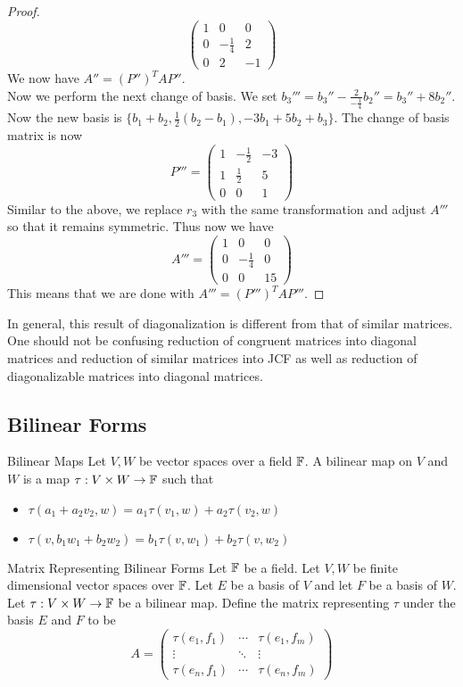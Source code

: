 \documentclass[a4paper]{article}
\begin{document}
\begin{eg}{}{}
\begin{proof}
$$\begin{pmatrix}
1 & 0 & 0\\
0 & -\frac{1}{4} & 2\\
0 & 2 & -1
\end{pmatrix}$$
We now have $A''=(P'')^TAP''$. \\
Now we perform the next change of basis. We set $b_3'''=b_3''-\frac{2}{-\frac{1}{4}}b_2''=b_3''+8b_2''$. Now the new basis is $\{b_1+b_2,\frac{1}{2}(b_2-b_1),-3b_1+5b_2+b_3\}$. The change of basis matrix is now $$P'''=\begin{pmatrix}
1 & -\frac{1}{2} & -3\\
1 & \frac{1}{2} & 5\\
0 & 0 & 1
\end{pmatrix}$$ Similar to the above, we replace $r_3$ with the same transformation and adjust $A'''$ so that it remains symmetric. Thus now we have $$A'''=\begin{pmatrix}
1 & 0 & 0\\
0 & -\frac{1}{4} & 0\\
0 & 0 & 15
\end{pmatrix}$$
This means that we are done with $A'''=(P''')^TAP'''$. 
\end{proof}
\end{eg}

In general, this result of diagonalization is different from that of similar matrices. One should not be confusing reduction of congruent matrices into diagonal matrices and reduction of similar matrices into JCF as well as reduction of diagonalizable matrices into diagonal matrices. 

\subsection{Bilinear Forms}
\begin{defn}{Bilinear Maps}{} Let $V,W$ be vector spaces over a field $\mathbb{F}$. A bilinear map on $V$ and $W$ is a map $\tau:V\times W\to\mathbb{F}$ such that 
\begin{itemize}
\item $\tau(a_1+a_2v_2,w)=a_1\tau(v_1,w)+a_2\tau(v_2,w)$
\item $\tau(v,b_1w_1+b_2w_2)=b_1\tau(v,w_1)+b_2\tau(v,w_2)$
\end{itemize}
\end{defn}

\begin{defn}{Matrix Representing Bilinear Forms}{} Let $\mathbb{F}$ be a field. Let $V,W$ be finite dimensional vector spaces over $\mathbb{F}$. Let $E$ be a basis of $V$ and let $F$ be a basis of $W$. Let $\tau:V\times W\to\mathbb{F}$ be a bilinear map. Define the matrix representing $\tau$ under the basis $E$ and $F$ to be $$A=\begin{pmatrix}
\tau(e_1,f_1) & \cdots & \tau(e_1,f_m)\\
\vdots & \ddots & \vdots\\
\tau(e_n,f_1) & \cdots & \tau(e_n,f_m)
\end{pmatrix}$$
\end{defn}
\end{document}
